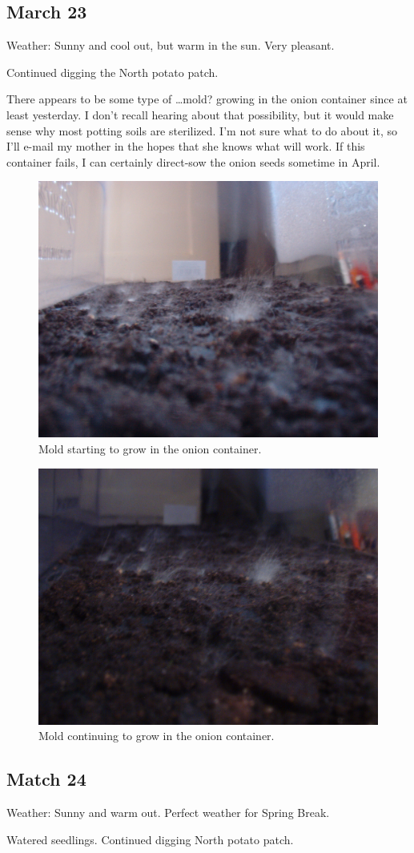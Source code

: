 \documentclass{article}
\begin{document}
\subsection*{March 23}
Weather: Sunny and cool out, but warm in the sun. Very pleasant.

Continued digging the North potato patch.

There appears to be some type of \ldots mold? growing in the onion container since at least yesterday. I don't recall hearing about that possibility, but it would make sense why most potting soils are sterilized. I'm not sure what to do about it, so I'll e-mail my mother in the hopes that she knows what will work. If this container fails, I can certainly direct-sow the onion seeds sometime in April.
\begin{figure}
\protect \includegraphics[scale=0.20]{pics/0323_mold1.jpg}
\caption{Mold starting to grow in the onion container.}
\end{figure}
\begin{figure}
\protect \includegraphics[scale=0.20]{pics/0323_mold2.jpg}
\caption{Mold continuing to grow in the onion container.}
\end{figure}

\subsection*{Match 24}
Weather: Sunny and warm out. Perfect weather for Spring Break.

Watered seedlings. Continued digging North potato patch.
\end{document}
